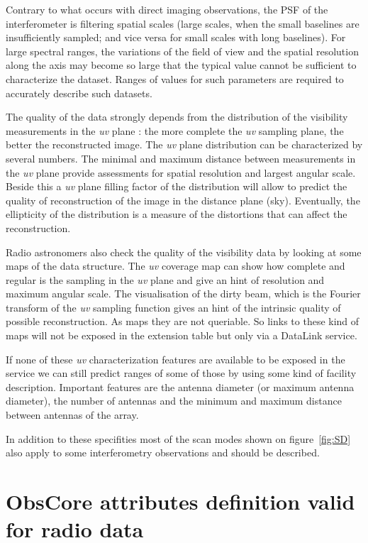 \documentclass[11pt,a4paper]{ivoa}
\begin{document}
Contrary to what occurs with direct imaging observations, the PSF of the interferometer
is filtering spatial scales (large scales, when the small baselines are insufficiently 
sampled; and vice versa for small scales with long baselines).
For large spectral ranges, the variations of the field of view and the spatial resolution 
along the axis may become so large that the typical value cannot be sufficient to 
characterize the dataset. Ranges of values for such parameters are required to accurately 
describe such datasets.

The quality of the data strongly depends from the distribution of the visibility measurements 
in the \emph{uv} plane : the more complete the \emph{uv} sampling plane, the better the reconstructed image. 
The \emph{uv} plane distribution can be characterized by several numbers. 
The minimal and maximum distance between measurements in the \emph{uv} plane provide assessments for 
spatial resolution and largest angular scale. 
Beside this a \emph{uv} plane filling factor of the distribution will allow to predict the quality 
of reconstruction of the image in the distance plane (sky).
Eventually, the ellipticity of the distribution is a measure of the distortions that can 
affect the reconstruction.

Radio astronomers also check the quality of the visibility data by looking at some maps of 
the data structure. The \emph{uv} coverage map can show how complete and regular is the sampling in 
the \emph{uv} plane and give an hint of resolution and maximum angular scale. 
The visualisation of the dirty beam, which is the Fourier transform of the \emph{uv} sampling 
function gives an hint of the intrinsic quality of possible reconstruction. As maps they are 
not queriable. So links to these kind of maps will not be exposed in the extension 
table but only via a DataLink service. 

If none of these \emph{uv} characterization features are available to be exposed in the service 
we can still predict ranges of some of those by using some kind of facility description.  
Important features are the antenna diameter (or maximum antenna diameter), the number of 
antennas and the minimum and maximum distance between antennas of the array.

In addition to these specifities most of the scan modes shown on figure~\ref{fig:SD} also 
apply to some interferometry observations and should be described. 

\section{ObsCore attributes definition valid for radio data}
\label{sec:ObsCoreRadDef}
\end{document}
